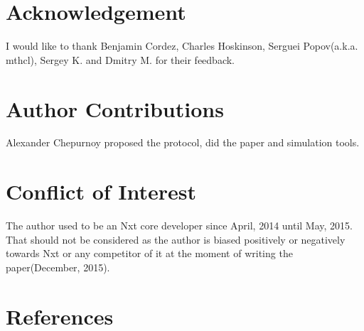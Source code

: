\documentclass[preprint,review,3p,times,twocolumn]{elsarticle}
\begin{document}
\section*{Acknowledgement}

I would like to thank Benjamin Cordez, Charles Hoskinson, Serguei Popov(a.k.a. mthcl), Sergey K. and Dmitry M. for their feedback.

\section*{Author Contributions}

Alexander Chepurnoy proposed the protocol, did the paper and simulation tools. 

\section*{Conflict of Interest}

The author used to be an Nxt core developer since April, 2014 until May, 2015. That should not be considered as the author is biased positively or negatively towards Nxt or any competitor of it at the moment of writing the paper(December, 2015). 


\section*{References}



\end{document}
